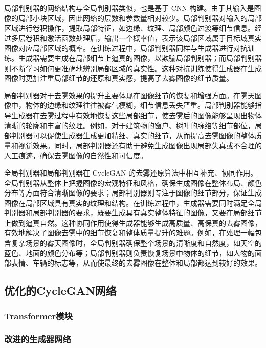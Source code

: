 局部判别器的网络结构与全局判别器类似，也是基于 CNN 构建。由于其输入是图像的局部小块区域，因此网络的层数和参数量相对较少。局部判别器对输入的局部区域进行卷积操作，提取局部特征，如边缘、纹理、局部颜色过渡等细节信息。经过多层卷积和激活函数处理后，输出一个概率值，表示该局部区域属于目标域真实图像对应局部区域的概率。在训练过程中，局部判别器同样与生成器进行对抗训练。生成器需要生成在局部细节上逼真的图像，以欺骗局部判别器；而局部判别器则不断学习如何更准确地辨别局部区域的真实性。这种对抗训练使得生成器在生成图像时更加注重局部细节的还原和真实感，提高了去雾图像的细节质量。


局部判别器对于去雾效果的提升主要体现在图像细节的恢复和增强方面。在雾天图像中，物体的边缘和纹理往往被雾气模糊，细节信息丢失严重。局部判别器能够指导生成器在去雾过程中有效地恢复这些局部细节，使去雾后的图像能够呈现出物体清晰的轮廓和丰富的纹理。例如，对于建筑物的窗户、树叶的脉络等细节部位，局部判别器可以促使生成器生成更加精细、真实的细节，从而提高去雾图像的整体质量和视觉效果。同时，局部判别器还有助于避免生成图像出现局部失真或不合理的人工痕迹，确保去雾图像的自然性和可信度。


全局判别器和局部判别器在 CycleGAN 的去雾还原算法中相互补充、协同作用。全局判别器从整体上把握图像的宏观特征和风格，确保生成图像在整体布局、颜色分布等方面符合清晰图像的要求；局部判别器则专注于图像的细节部分，保证生成图像在局部区域具有真实的纹理和结构。在训练过程中，生成器需要同时满足全局判别器和局部判别器的要求，既要生成具有真实整体特征的图像，又要在局部细节上做到逼真自然。这种协同作用使得生成器能够生成高质量、高保真的去雾图像，有效地解决了图像去雾中的细节恢复和整体质量提升的难题。例如，在处理一幅包含复杂场景的雾天图像时，全局判别器确保整个场景的清晰度和自然度，如天空的蓝色、地面的颜色分布等；局部判别器则负责恢复场景中物体的细节，如人物的面部表情、车辆的标志等，从而使最终的去雾图像在整体和局部都达到较好的效果。

\subsection{优化的CycleGAN网络}

\subsubsection{Transformer模块}

\subsubsection{改进的生成器网络}

